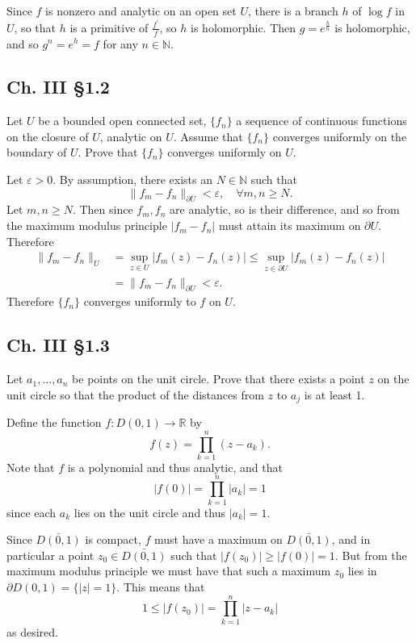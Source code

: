 \documentclass{article}
\newcommand\horline{\noindent\makebox[\linewidth]{\rule{\textwidth}{0.4pt}}}
\begin{document}
\horline

Since $f$ is nonzero and analytic on an open set $U$, there is a 
branch $h$ of $\log f$ in $U$, so that $h$ is a primitive of
$\frac{f^\prime}{f}$, so $h$ is holomorphic. Then 
$g = e^\frac{h}{n}$ is holomorphic, and so 
$g^n = e^h = f$ for any $n \in \mathbb{N}$.

\subsection*{Ch. III \S 1.2}
Let $U$ be a bounded open connected set, $\{f_n\}$ a sequence of
continuous functions on the closure of $U$, analytic on $U$. Assume
that $\{f_n\}$ converges uniformly on the boundary of $U$. Prove that
$\{f_n\}$ converges uniformly on $U$.

\horline

Let $\varepsilon > 0$. 
By assumption, there exists an $N \in \mathbb{N}$ such that
$$
\| f_m - f_n \|_{\partial U} < \varepsilon, \quad
\forall m, n \geq N.
$$
Let $m, n \geq N$. Then since $f_m, f_n$ are analytic, so is their difference, and so from
the maximum modulus principle $|f_m - f_n|$ must attain its maximum on
$\partial U$. Therefore 
\begin{align*}
     \| f_m - f_n \|_U 
&=    \sup_{z \in U} |f_m(z) - f_n(z)|
 \leq \sup_{z \in \partial U} |f_m(z) - f_n(z)| \\
&=    \| f_m - f_n \|_{\partial U}
 <    \varepsilon.
\end{align*}
Therefore $\{ f_n \}$ converges uniformly to $f$ on $U$.

\subsection*{Ch. III \S 1.3}
Let $a_1, \dots, a_n$ be points on the unit circle. Prove that there
exists a point $z$ on the unit circle so that the product of the 
distances from $z$ to $a_j$ is at least 1. 

\horline

Define the function $f : D(0, 1) \to \mathbb{R}$ by
$$
f(z) = \prod_{k=1}^n (z - a_k).
$$
Note that $f$ is a polynomial and thus analytic, and that
$$
|f(0)| = \prod_{k=1}^n |a_k| = 1
$$
since each $a_k$ lies on the unit circle and thus $|a_k| = 1$.

Since $\bar{D(0, 1)}$ is compact, $f$ must have a maximum
on $\bar{D(0, 1)}$, and in particular a point $z_0 \in \bar{D(0,1)}$
such that $|f(z_0)| \geq |f(0)| = 1$. But from the maximum modulus
principle we must have that such a maximum
$z_0$ lies in $\partial D(0, 1) = \{ |z| = 1 \}$. This means that
$$
1 \leq |f(z_0)| = \prod_{k=1}^n |z - a_k|
$$
as desired.
\end{document}
